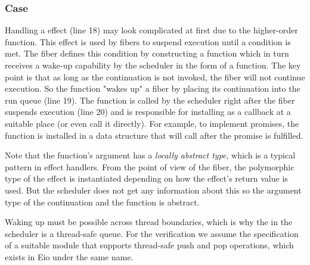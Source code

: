 \subsubsection*{\esuspend{} Case}
Handling a \esuspend{} effect (line 18) may look complicated at first due to the higher-order  function.
This effect is used by fibers to suspend execution until a condition is met.
The fiber defines this condition by constructing a  function which in turn receives a wake-up capability by the scheduler in the form of a  function.
The key point is that as long as the continuation  is not invoked, the fiber will not continue execution.
So the  function "wakes up" a fiber by placing its continuation  into the run queue (line 19).
The  function is called by the scheduler right after the fiber suspends execution (line 20) and is responsible for installing  as a callback at a suitable place (or even call it directly).
For example, to implement promises, the  function is installed in a data structure that will call  after the promise is fulfilled.

Note that the  function's argument  has a \emph{locally abstract type}, which is a typical pattern in effect handlers.
From the point of view of the fiber, the polymorphic type  of the \esuspend{} effect is instantiated depending on how the effect's return value is used.
But the scheduler does not get any information about this so the argument type of the continuation  and the  function is abstract.

Waking up must be possible across thread boundaries, which is why the  in the scheduler is a thread-safe queue.
For the verification we assume the specification of a suitable  module that supports thread-safe push and pop operations, which exists in Eio under the same name.


\subsubsection{}
\label{sec:sched-impl-fork}

